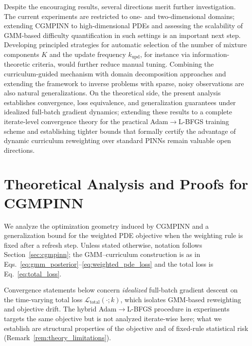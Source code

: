 \documentclass{article}
\theoremstyle{plain}
\theoremstyle{definition}
\theoremstyle{remark}
\begin{document}
	Despite the encouraging results, several directions merit further investigation. The current experiments are restricted to one- and two-dimensional domains; extending CGMPINN to high-dimensional PDEs and assessing the scalability of GMM-based difficulty quantification in such settings is an important next step. Developing principled strategies for automatic selection of the number of mixture components $K$ and the update frequency $k_{\mathrm{upd}}$, for instance via information-theoretic criteria, would further reduce manual tuning. Combining the curriculum-guided mechanism with domain decomposition approaches and extending the framework to inverse problems with sparse, noisy observations are also natural generalizations. On the theoretical side, the present analysis establishes convergence, loss equivalence, and generalization guarantees under idealized full-batch gradient dynamics; extending these results to a complete iterate-level convergence theory for the practical Adam$\to$L-BFGS training scheme and establishing tighter bounds that formally certify the advantage of dynamic curriculum reweighting over standard PINNs remain valuable open directions.
	
	
	
	
	
	
\clearpage
\appendix
{}
\allowdisplaybreaks[2]

\section{Theoretical Analysis and Proofs for CGMPINN}
\label{app:theory}

We analyze the optimization geometry induced by CGMPINN and a
generalization bound for the weighted PDE objective when the weighting rule
is fixed after a refresh step.
Unless stated otherwise, notation follows Section~\ref{sec:cgmpinn}; the
GMM--curriculum construction is as in
Eqs.~\eqref{eq:gmm_posterior}--\eqref{eq:weighted_pde_loss} and the total
loss is Eq.~\eqref{eq:total_loss}.

Convergence statements below concern \emph{idealized} full-batch gradient
descent on the time-varying total loss $\mathcal{L}_{\mathrm{total}}(\cdot;k)$,
which isolates GMM-based reweighting and objective drift.
The hybrid Adam$\to$L-BFGS procedure in experiments targets the same
objective but is not analyzed iterate-wise here; what we establish are
structural properties of the objective and of fixed-rule statistical risk
(Remark~\ref{rem:theory_limitations}).
\end{document}
